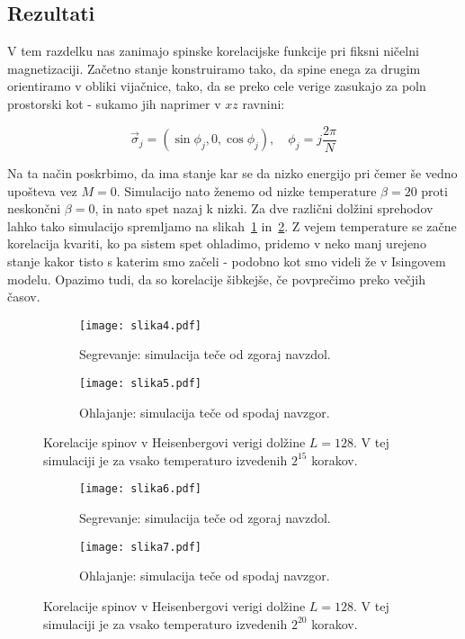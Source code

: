 \documentclass[a4paper]{article}
\newcommand{\s}{\sigma}
\newcommand{\vs}{\vec{\s}}
\begin{document}
    \subsection{Rezultati}

    V tem razdelku nas zanimajo spinske korelacijske funkcije pri fiksni ničelni magnetizaciji.
    Začetno stanje konstruiramo tako, da spine enega za drugim orientiramo v obliki vijačnice, tako, da se preko
    cele verige zasukajo za poln prostorski kot - sukamo jih naprimer v $xz$ ravnini:

    \begin{equation}\label{eq16}
        \vs_j = (\sin{\phi_j}, 0, \cos{\phi_j}), \quad \phi_j = j\frac{2\pi}{N}
    \end{equation}

    Na ta način poskrbimo, da ima stanje kar se da nizko energijo pri čemer še vedno upošteva vez $M = 0$.
    Simulacijo nato ženemo od nizke temperature $\beta = 20$ proti neskončni $\beta = 0$, in nato spet nazaj k nizki.
    Za dve različni dolžini sprehodov lahko tako simulacijo spremljamo na slikah~\ref{slika2} in~\ref{slika3}.
    Z vejem temperature se začne korelacija kvariti, ko pa sistem spet ohladimo, pridemo v neko manj urejeno stanje
    kakor tisto s katerim smo začeli - podobno kot smo videli že v Isingovem modelu.
    Opazimo tudi, da so korelacije šibkejše, če povprečimo preko večjih časov.

    \begin{figure}
        \centering
        \begin{subfigure}{\textwidth}
            \texttt{[image: slika4.pdf]}
            \caption{Segrevanje: simulacija teče od zgoraj navzdol.}
        \end{subfigure}
        \begin{subfigure}{\textwidth}
            \texttt{[image: slika5.pdf]}
            \caption{Ohlajanje: simulacija teče od spodaj navzgor.}
        \end{subfigure}
        \caption{Korelacije spinov v Heisenbergovi verigi dolžine $L = 128$.
        V tej simulaciji je za vsako temperaturo izvedenih $2^{15}$ korakov.}
        \label{slika2}
    \end{figure}

    \begin{figure}
        \centering
        \begin{subfigure}{\textwidth}
            \texttt{[image: slika6.pdf]}
            \caption{Segrevanje: simulacija teče od zgoraj navzdol.}
        \end{subfigure}
        \begin{subfigure}{\textwidth}
            \texttt{[image: slika7.pdf]}
            \caption{Ohlajanje: simulacija teče od spodaj navzgor.}
        \end{subfigure}
        \caption{Korelacije spinov v Heisenbergovi verigi dolžine $L = 128$.
        V tej simulaciji je za vsako temperaturo izvedenih $2^{20}$ korakov.}
        \label{slika3}
    \end{figure}
\end{document}
